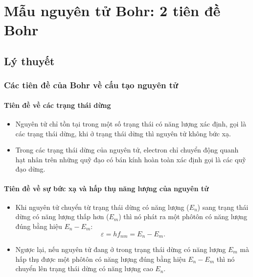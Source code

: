 
\chapter[Mẫu nguyên tử Bohr: 2 tiên đề Bohr]{Mẫu nguyên tử Bohr: 2 tiên đề Bohr}

\section{Lý thuyết}

\subsection{Các tiên đề của Bohr về cấu tạo nguyên tử}
\subsubsection{Tiên đề về các trạng thái dừng}
\begin{itemize}
	\item Nguyên tử chỉ tồn tại trong một số trạng thái có năng lượng xác định, gọi là các trạng thái dừng, khi ở trạng thái dừng thì nguyên tử không bức xạ.
	\item Trong các trạng thái dừng của nguyên tử, electron chỉ chuyển động quanh hạt nhân trên những quỹ đạo có bán kính hoàn toàn xác định gọi là các quỹ đạo dừng.
\end{itemize}

\subsubsection{Tiên đề về sự bức xạ và hấp thụ năng lượng của nguyên tử}
\begin{itemize}
	\item Khi nguyên tử chuyển từ trạng thái dừng có năng lượng ($E_ n$) sang trạng thái dừng có năng lượng thấp hơn ($E_m$) thì nó phát ra một phôtôn có năng lượng đúng bằng hiệu $E_n-E_m$:
	\begin{equation}
		\varepsilon = h f_{nm}=E_n-E_m.
	\end{equation}
	\item Ngược lại, nếu nguyên tử đang ở trong trạng thái dừng có năng lượng $E_m$ mà hấp thụ được một phôtôn có năng lượng đúng bằng hiệu $E_n-E_m$ thì nó chuyển lên trạng thái dừng có năng lượng cao $E_n$.
\end{itemize}
